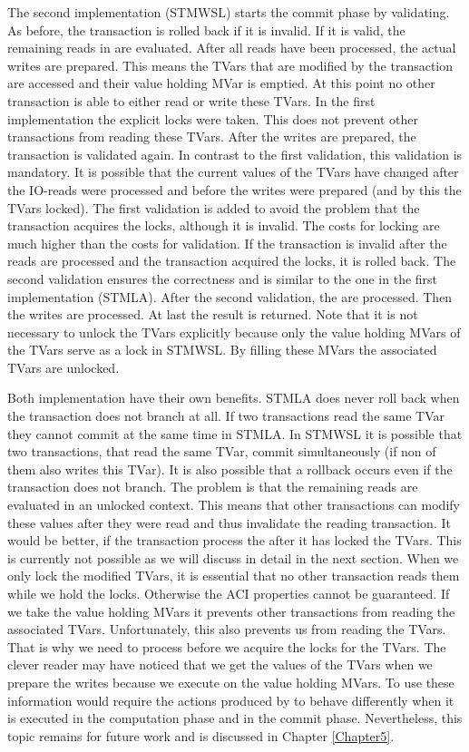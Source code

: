The second implementation (STMWSL) starts the commit phase by validating. As before, the 
transaction is rolled back if it is invalid. If it is valid, the remaining reads in 
 are evaluated. After all reads have been processed, the actual writes are
prepared. This means the TVars that are modified by the transaction are accessed and
their value holding MVar is emptied. At this point no other transaction is able to 
either read or write these TVars. In the first implementation the explicit locks 
were taken. This does not prevent other transactions from reading these TVars.
After the writes are prepared, the transaction is validated again. In contrast to 
the first validation, this validation is mandatory. It is possible that the current
values of the TVars have changed after the IO-reads were processed and before the 
writes were prepared (and by this the TVars locked). The first validation is
added to avoid the problem that the transaction acquires the locks, although it 
is invalid. The costs for locking are much higher than the costs for validation.
If the transaction is invalid after the reads are processed and the transaction
acquired the locks, it is rolled back. The second validation ensures the correctness
and is similar to the one in the first implementation (STMLA). After the second validation, 
the  are processed. Then the writes are processed. At last the result is returned. Note that
it is not necessary to unlock the TVars explicitly because only the value 
holding MVars of the TVars serve as a lock in STMWSL. By filling these MVars
the associated TVars are unlocked. 

Both implementation have their own benefits. STMLA does never roll back
when the transaction does not branch at all. If two transactions read the
same TVar they cannot commit at the same time in STMLA. In STMWSL it is
possible that two transactions, that read the same TVar, commit simultaneously
(if non of them also writes this TVar). It is also possible
that a rollback occurs even if the transaction does not branch. The 
problem is that the remaining reads are evaluated in an unlocked context.
This means that other transactions can modify these values after they were 
read and thus invalidate the reading transaction. It would be better, if the
transaction process the  after it has locked the TVars. This is 
currently not possible as we will discuss in detail in the next section. When 
we only lock the modified TVars, it is essential that no other transaction 
reads them while we hold the locks. Otherwise the ACI properties cannot be 
guaranteed. If we take the value holding MVars it prevents other transactions
from reading the associated TVars. Unfortunately, this also prevents us from 
reading the TVars. That is why we need to process  before we 
acquire the locks for the TVars. The clever reader may have noticed that 
we get the values of the TVars when we prepare the writes because we execute
 on the value holding MVars. To use these information would 
require the  actions produced by  to 
behave differently when it is executed in the computation phase and in the 
commit phase. Nevertheless, this topic remains for future work and is discussed 
in Chapter \ref{Chapter5}.

